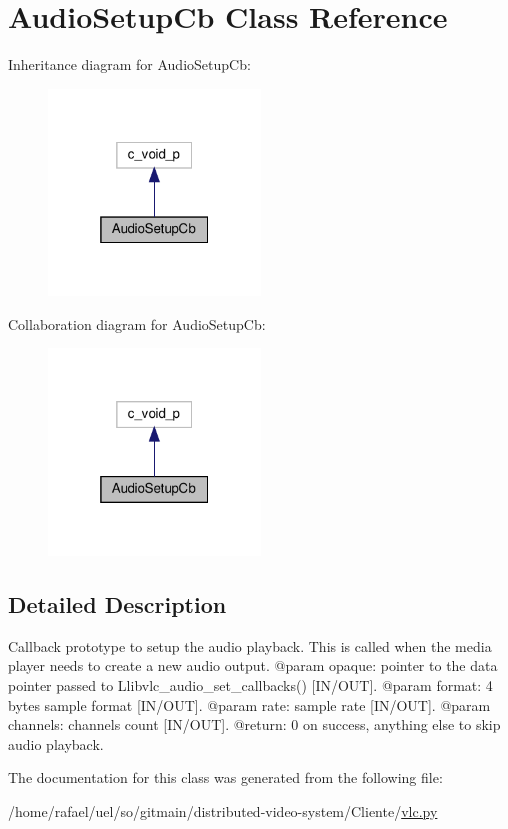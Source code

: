 \hypertarget{classvlc_1_1_audio_setup_cb}{}\section{Audio\+Setup\+Cb Class Reference}
\label{classvlc_1_1_audio_setup_cb}


Inheritance diagram for Audio\+Setup\+Cb\+:
\nopagebreak
\begin{figure}[H]
\begin{center}
\leavevmode
\includegraphics[width=160pt]{classvlc_1_1_audio_setup_cb__inherit__graph}
\end{center}
\end{figure}


Collaboration diagram for Audio\+Setup\+Cb\+:
\nopagebreak
\begin{figure}[H]
\begin{center}
\leavevmode
\includegraphics[width=160pt]{classvlc_1_1_audio_setup_cb__coll__graph}
\end{center}
\end{figure}


\subsection{Detailed Description}
\begin{DoxyVerb}Callback prototype to setup the audio playback.
This is called when the media player needs to create a new audio output.
@param opaque: pointer to the data pointer passed to L{libvlc_audio_set_callbacks}() [IN/OUT].
@param format: 4 bytes sample format [IN/OUT].
@param rate: sample rate [IN/OUT].
@param channels: channels count [IN/OUT].
@return: 0 on success, anything else to skip audio playback.
\end{DoxyVerb}
 

The documentation for this class was generated from the following file\+:\begin{DoxyCompactItemize}
\item 
/home/rafael/uel/so/gitmain/distributed-\/video-\/system/\+Cliente/\hyperlink{vlc_8py}{vlc.\+py}\end{DoxyCompactItemize}
